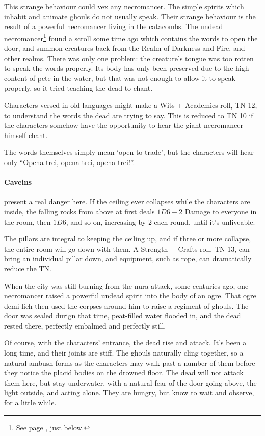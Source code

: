 \begin{multicols}{2}
This strange behaviour could vex any necromancer.  The simple spirits which inhabit and animate ghouls do not usually speak.  Their strange behaviour is the result of a powerful necromancer living in the catacombs.  The undead necromancer\footnote{See page \pageref{undead_ogre}, just below.} found a scroll some time ago which contains the words to open the door, and summon creatures back from the Realm of Darkness and Fire, and other realms.  There was only one problem: the creature's tongue was too rotten to speak the words properly.  Its body has only been preserved due to the high content of pete in the water, but that was not enough to allow it to speak properly, so it tried teaching the dead to chant.

Characters versed in old languages might make a Wits + Academics roll, TN 12, to understand the words the dead are trying to say.  This is reduced to TN 10 if the characters somehow have the opportunity to hear the giant necromancer himself chant.

The words themselves simply mean `open to trade', but the characters will hear only ``Opena trei, opena trei, opena trei!''.

\paragraph{Caveins} present a real danger here.  If the ceiling ever collapses while the characters are inside, the falling rocks from above at first deals $1D6-2$ Damage to everyone in the room, then $1D6$, and so on, increasing by 2 each round, until it's unliveable.


The pillars are integral to keeping the ceiling up, and if three or more collapse, the entire room will go down with them.  A Strength + Crafts roll, TN 13, can bring an individual pillar down, and equipment, such as rope, can dramatically reduce the TN.

When the city was still burning from the nura attack, some centuries ago, one necromancer raised a powerful undead spirit into the body of an ogre.
That ogre demi-lich then used the corpses around him to raise a regiment of ghouls.
The door was sealed durign that time, peat-filled water flooded in, and the dead rested there, perfectly embalmed and perfectly still.

Of course, with the characters' entrance, the dead rise and attack.  It's been a long time, and their joints are stiff.  The ghouls naturally cling together, so a natural ambush forms as the characters may walk past a number of them before they notice the placid bodies on the drowned floor.  The dead will not attack them here, but stay underwater, with a natural fear of the door going above, the light outside, and acting alone.  They are hungry, but know to wait and observe, for a little while.


\end{multicols}
